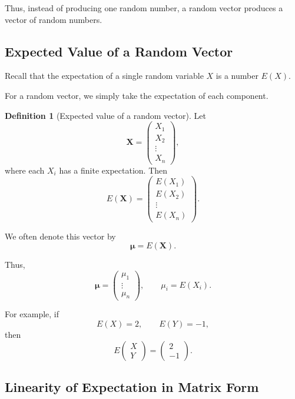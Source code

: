 \documentclass[11pt]{article}
\theoremstyle{definition}
\newtheorem{definition}{Definition}
\theoremstyle{plain}
\theoremstyle{remark}
\begin{document}
Thus, instead of producing one random number, a random vector
produces a vector of random numbers.


\subsection*{Expected Value of a Random Vector}

Recall that the expectation of a single random variable $X$ is a
number $E(X)$.

For a random vector, we simply take the expectation of each
component.

\begin{definition}[Expected value of a random vector]
Let
\[
\mathbf{X}
=
\begin{pmatrix}
X_1\\
X_2\\
\vdots\\
X_n
\end{pmatrix},
\]
where each $X_i$ has a finite expectation. Then
\[
{
E(\mathbf{X})
=
\begin{pmatrix}
E(X_1)\\
E(X_2)\\
\vdots\\
E(X_n)
\end{pmatrix}.
}
\]

We often denote this vector by
\[
\boldsymbol{\mu}=E(\mathbf{X}).
\]
\end{definition}

Thus,
\[
\boldsymbol{\mu}
=
\begin{pmatrix}
\mu_1\\
\vdots\\
\mu_n
\end{pmatrix},
\qquad
\mu_i=E(X_i).
\]

For example, if
\[
E(X)=2,
\qquad
E(Y)=-1,
\]
then
\[
E
\begin{pmatrix}
X\\
Y
\end{pmatrix}
=
\begin{pmatrix}
2\\
-1
\end{pmatrix}.
\]


\subsection*{Linearity of Expectation in Matrix Form}
\end{document}
